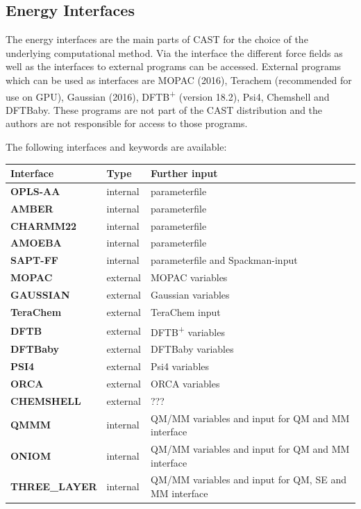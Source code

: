 \documentclass[10pt,a4paper]{article} %
\begin{document}
	\subsection{Energy Interfaces}
	The energy interfaces are the main parts of \ac{CAST} for the choice of the underlying computational method. Via the interface the different force fields as well as the interfaces to external programs can be accessed.
	External programs which can be used as interfaces are MOPAC (2016)\supercite{mopac}\supercite{mopac_parallel}, Terachem\supercite{terachem} (recommended for use on GPU), Gaussian (2016)\supercite{g16}, DFTB\textsuperscript{+}\supercite{dftb} (version 18.2), Psi4\supercite{parrish_psi4_2017}, Chemshell\supercite{metz_chemshellmodular_2014} and DFTBaby\supercite{humeniuk_dftbaby:_2017}. These programs are not part of the \ac{CAST} distribution and the authors are not responsible for access to those programs.
	
	The following interfaces and keywords are available:
	\begin{longtable}{l|l|p{6.5cm}}
		Interface & Type & Further input \\
		\hline
		\textbf{OPLS-AA} & internal & parameterfile \\
		\textbf{AMBER} & internal & parameterfile \\
		\textbf{CHARMM22} & internal & parameterfile \\
		\textbf{AMOEBA} & internal & parameterfile\\
		\textbf{SAPT-FF} & internal &parameterfile and Spackman-input\\
		\textbf{MOPAC} & external & MOPAC variables\\
		\textbf{GAUSSIAN} & external & Gaussian variables\\
		\textbf{TeraChem} & external & TeraChem input\\
		\textbf{DFTB} & external & DFTB\textsuperscript{+} variables\\
		\textbf{DFTBaby} & external & DFTBaby variables\\
		\textbf{PSI4} & external & Psi4 variables\\
		\textbf{ORCA} & external & ORCA variables\\
		\textbf{CHEMSHELL} & external & ???\\
		\textbf{QMMM} & internal & QM/MM variables and input for QM and MM interface\\
		\textbf{ONIOM} & internal &  QM/MM variables and input for QM and MM interface\\
		\textbf{THREE\_LAYER} & internal &  QM/MM variables and input for QM, SE and MM interface\\
	\end{longtable}	
\end{document}
